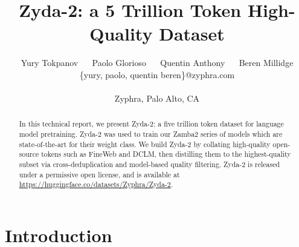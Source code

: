 \documentclass[conference]{IEEEtran}
\begin{document}
\makeatletter
  \def\title@font{\Large}
  \let\ltx@maketitle\@maketitle
  \def\@maketitle{\bgroup%
    \let\ltx@title\@title%
    \def\@title{\resizebox{\textwidth}{!}{%
      \mbox{\title@font\ltx@title}%
    }}%
    \ltx@maketitle%
  \egroup}
\makeatother

\title{Zyda-2: a 5 Trillion Token High-Quality Dataset}
\author{Yury Tokpanov $\quad$ Paolo Glorioso $\quad$ Quentin Anthony $\quad$ Beren Millidge \\
{
\small
\{yury, paolo, quentin beren\}@zyphra.com
}\\

{}\\
{
 Zyphra, Palo Alto, CA
 \small
}\\

}

\maketitle

\setcounter{page}{1}

\begin{abstract}

In this technical report, we present Zyda-2: a five trillion token dataset for language model pretraining. Zyda-2 was used to train our Zamba2 series of models which are state-of-the-art for their weight class. We build Zyda-2 by collating high-quality open-source tokens such as FineWeb and DCLM, then distilling them to the highest-quality subset via cross-deduplication and model-based quality filtering. Zyda-2 is released under a permissive open license, and is available at \url{https://huggingface.co/datasets/Zyphra/Zyda-2}.

\end{abstract}

\section{Introduction}
\end{document}
